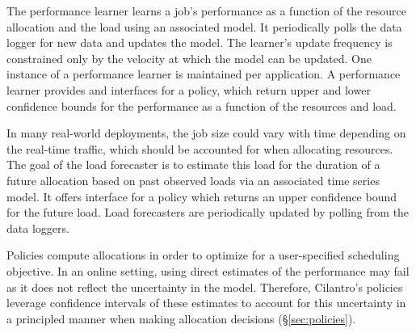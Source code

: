 The performance learner learns a job's performance as a function of the
resource allocation and the load using an associated model.
It periodically polls the data logger for new data and updates the model.
The learner's update frequency is constrained only by the velocity at which the model
can be updated.
One instance of a performance learner is maintained per application.
% 
A performance learner provides 
 and  interfaces for a policy, which return upper and lower confidence bounds for the performance as a function of the resources and load.

\insertFigUtilityIllus

In many real-world deployments, the job size could vary with time depending on the real-time traffic,
which should be accounted for when allocating resources.
The goal of the load forecaster is to estimate this load for the duration of a future allocation
based on past observed loads via an associated time series model.
It offers \gettsucb{} interface for a policy which returns an upper confidence
bound for the future load.
Load forecasters are periodically updated by polling from the data loggers.

Policies compute allocations in order to optimize for a user-specified scheduling objective.
In an online setting, using direct estimates of the performance may fail as
it does not reflect the uncertainty in the model.
Therefore, Cilantro's policies leverage confidence intervals of these estimates to
account for this uncertainty in a principled manner when making allocation decisions (\S\ref{sec:policies}).


